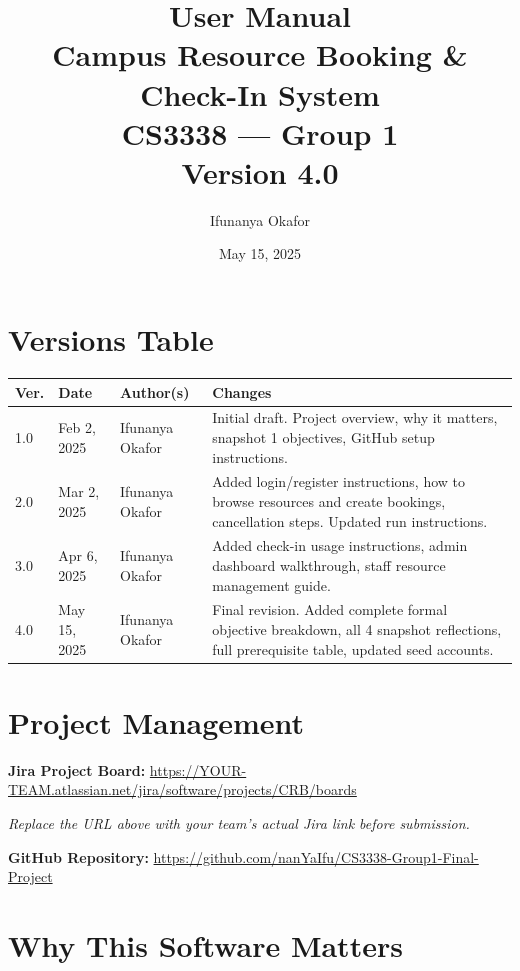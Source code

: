 \documentclass[12pt]{article}
\title{
    \vspace{2cm}
    {\Large User Manual} \\[1em]
    {\LARGE \textbf{Campus Resource Booking \& Check-In System}} \\[2em]
    {\large CS3338 --- Group 1} \\[0.5em]
    {\normalsize Version 4.0}
    \vspace{2cm}
}
\author{Ifunanya Okafor}
\date{May 15, 2025}
\begin{document}
\maketitle
\thispagestyle{empty}
\newpage

\tableofcontents
\newpage

\section*{Versions Table}

\begin{longtable}{|p{1.4cm}|p{2.4cm}|p{3.5cm}|p{6.5cm}|}
\hline
\textbf{Ver.} & \textbf{Date} & \textbf{Author(s)} & \textbf{Changes} \\
\hline
1.0 & Feb 2, 2025  & Ifunanya Okafor & Initial draft. Project overview, why it matters, snapshot 1 objectives, GitHub setup instructions. \\
\hline
2.0 & Mar 2, 2025  & Ifunanya Okafor & Added login/register instructions, how to browse resources and create bookings, cancellation steps. Updated run instructions. \\
\hline
3.0 & Apr 6, 2025  & Ifunanya Okafor & Added check-in usage instructions, admin dashboard walkthrough, staff resource management guide. \\
\hline
4.0 & May 15, 2025 & Ifunanya Okafor & Final revision. Added complete formal objective breakdown, all 4 snapshot reflections, full prerequisite table, updated seed accounts. \\
\hline
\end{longtable}
\newpage

\section{Project Management}

\textbf{Jira Project Board:}
\url{https://YOUR-TEAM.atlassian.net/jira/software/projects/CRB/boards}

\textit{Replace the URL above with your team's actual Jira link before submission.}

\textbf{GitHub Repository:}
\url{https://github.com/nanYaIfu/CS3338-Group1-Final-Project}

\section{Why This Software Matters}
\end{document}
